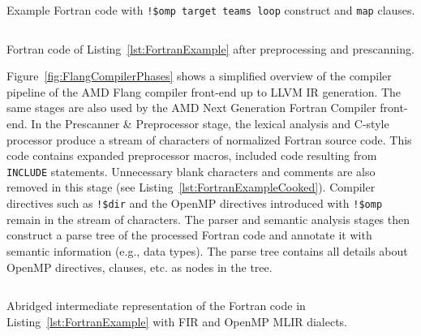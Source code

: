 \documentclass[acmtog,natbib=false]{acmart}
\newcommand{\code}[1]{\texttt{#1}\xspace}
\begin{document}
\begin{listing}[t]
\inputminted{Fortran}{code/tgt_loop.f90}
\caption{Example Fortran code with \code{!\$omp target teams loop} construct and \code{map} clauses.}
\label{lst:FortranExample}
\end{listing}

\begin{listing}[t]
\inputminted{text}{code/tgt_loop_cooked.f90}
\caption{Fortran code of Listing~\ref{lst:FortranExample} after preprocessing and prescanning.}
\label{lst:FortranExampleCooked}
\end{listing}

Figure~\ref{fig:FlangCompilerPhases} shows a simplified overview of the compiler pipeline of the AMD Flang compiler front-end up to LLVM \ac{IR} generation.
The same stages are also used by the AMD Next Generation Fortran Compiler front-end.
In the Prescanner \& Preprocessor stage, the lexical analysis and C-style processor produce a stream of characters of normalized Fortran source code. 
This code contains expanded preprocessor macros, included code resulting from \code{INCLUDE} statements. Unnecessary blank characters and comments are also removed in this stage (see Listing~\ref{lst:FortranExampleCooked}).
Compiler directives such as \code{!\$dir} and the OpenMP directives introduced with \code{!\$omp} remain in the stream of characters.
The parser and semantic analysis stages then construct a parse tree of the processed Fortran code and annotate it with semantic information (e.g., data types).
The parse tree contains all details about OpenMP directives, clauses, etc. as nodes in the tree.

\begin{listing}[t]
\inputminted{MLIR-lexer.py:MlirLexer -x}{code/tgt_loop_abridged.fir}
\caption{Abridged intermediate representation of the Fortran code in Listing~\ref{lst:FortranExample} with \acs{FIR} and OpenMP \acs{MLIR} dialects.}
\label{lst:FortranExampleFIR}
\end{listing}

\end{document}
